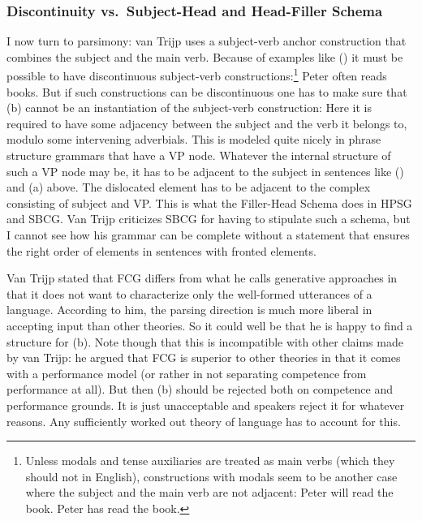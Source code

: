 \subsubsection{Discontinuity vs.\ Subject-Head and Head-Filler Schema}
\label{sec-discontinuous-constituents-fcg}

I now turn to parsimony: van Trijp uses a subject-verb anchor construction that combines the subject
and the main verb. Because of examples like () it must be possible to have discontinuous subject-verb constructions:\footnote{%
  Unless modals and tense auxiliaries are treated as main verbs (which they should not in English), constructions with
  modals seem to be another case where the subject and the main verb are not adjacent:
  \eal
  \ex Peter will read the book.
  \ex Peter has read the book.
  \zllast
} 
\ea
Peter often reads books.
\z
But if such constructions can be discontinuous one has to make sure that (b) cannot be an
instantiation of the subject-verb construction:
\eal
{}
\zl
Here it is required to have some adjacency between the subject and the verb it belongs to, modulo
some intervening adverbials. This is modeled quite nicely in phrase structure grammars that have a
VP node. Whatever the internal structure of such a VP node may be, it has to be adjacent to the
subject in sentences like  () and (a) above. The dislocated element has to be adjacent to the complex
consisting of subject and VP. This is what the Filler-Head Schema does in HPSG and SBCG. Van Trijp
criticizes SBCG for having to stipulate such a schema, but I cannot see how his grammar can be
complete without a statement that ensures the right order of elements in sentences with fronted
elements.

Van Trijp stated that FCG differs from what he calls generative approaches in that it does not want
to characterize only the well-formed utterances of a language. According to him, the parsing direction
 is much more liberal in accepting input than other theories. So it could well be that he
is happy to find a structure for (b). Note though that this is incompatible with other claims
made by van Trijp: he argued that FCG is superior to other theories in that it comes with a performance
model (or rather in not separating competence from performance at all). But then (b) should be
rejected both on competence and performance grounds. It is just unacceptable and speakers reject it
for whatever reasons. Any sufficiently worked out theory of language has to account for this.


